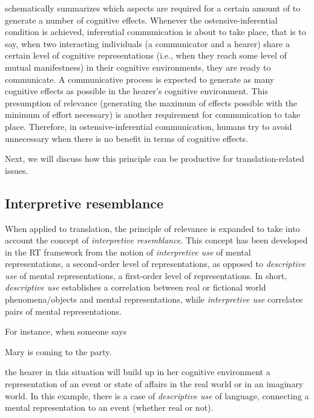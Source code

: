 \documentclass[output=paper]{langsci/langscibook}
\begin{document}
 schematically summarizes which aspects are required for a certain amount of  to generate a number of cognitive effects. Whenever the ostensive-inferential condition is achieved, inferential communication is about to take place, that is to say, when two interacting individuals (a communicator and a hearer) share a certain level of cognitive representations (i.e., when they reach some level of mutual manifestness) in their cognitive environments, they are ready to communicate. A communicative process is expected to generate as many cognitive effects as possible in the hearer's cognitive environment. This presumption of relevance (generating the maximum of effects possible with the minimum of effort necessary) is another requirement for communication to take place. Therefore, in ostensive-inferential communication, humans try to avoid unnecessary  when there is no benefit in terms of cognitive effects.



Next, we will discuss how this principle can be productive for translation-related issues.


\subsection{Interpretive resemblance\label{alves:sec:InterpretiveResemblance}}

When applied to translation, the principle of relevance is expanded to take into account the concept of \textit{interpretive resemblance}. This concept has been developed in the RT framework from the notion of \textit{interpretive use} of mental representations, a second-order level of representations, as opposed to \textit{descriptive use }of mental representations, a first-order level of representations. In short, \textit{descriptive use }establishes a correlation between real or fictional world phenomena/objects and mental representations, while \textit{interpretive use} correlates pairs of mental representations. 


For instance, when someone says 

\ea
Mary is coming to the party. \\
\z

the hearer in this situation will build up in her cognitive environment a representation of an event or state of affairs in the real world or in an imaginary world. In this example, there is a case of \textit{descriptive use} of language, connecting a mental representation to an event (whether real or not). 
\end{document}
